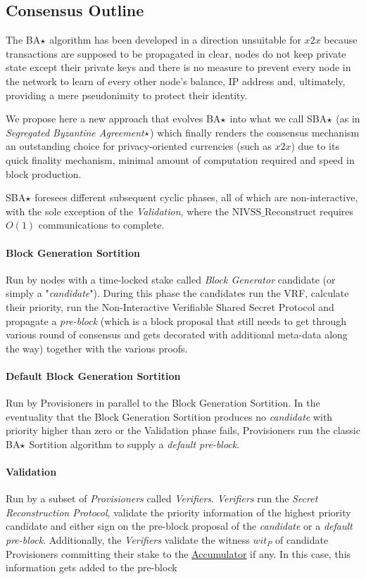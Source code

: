 \subsection{Consensus Outline}

The BA$\large\star$ algorithm has been developed in a direction unsuitable for $x2x$ because transactions are supposed to be propagated in clear, nodes do not keep private state except their private keys and there is no measure to prevent every node in the network to learn of every other node's balance, IP address and, ultimately, providing a mere pseudonimity to protect their identity.

We propose here a new approach that evolves BA$\large\star$ into what we call SBA$\large\star$ (as in \textit{Segregated Byzantine Agreement}$\large\star$) which finally renders the consensus mechanism an outstanding choice for privacy-oriented currencies (such as $x2x$) due to its quick finality mechanism, minimal amount of computation required and speed in block production.

SBA$\large\star$ foresees different subsequent cyclic phases, all of which are non-interactive, with the sole exception of the \textit{Validation}, where the $\textrm{NIVSS\_Reconstruct}$ requires $O(1)$ communications to complete.
\paragraph*{Block Generation Sortition} Run by nodes with a time-locked stake called \textit{Block Generator} candidate (or simply a "\textit{candidate}"). During this phase the candidates run the VRF, calculate their priority, run the Non-Interactive Verifiable Shared Secret Protocol and propagate a \textit{pre-block} (which is a block proposal that still needs to get through various round of consensus and gets decorated with additional meta-data along the way) together with the various proofs.

\paragraph*{Default Block Generation Sortition} 
Run by Provisioners in parallel to the Block Generation Sortition. In the eventuality that the Block Generation Sortition produces no \textit{candidate} with priority higher than zero or the Validation phase fails, Provisioners run the classic BA$\large\star$ Sortition algorithm to supply a \textit{default pre-block}.  
\paragraph*{Validation}
Run by a subset of \textit{Provisioners} called \textit{Verifiers}. \textit{Verifiers} run the \textit{Secret Reconstruction Protocol}, validate the priority information of the highest priority candidate and either sign on the pre-block proposal of the \textit{candidate} or a \textit{default pre-block}. Additionally, the \textit{Verifiers} validate the witness $wit_P$ of candidate Provisioners committing their stake to the \hyperref[sec:Cryptographically-Committed-Provisioners]{Accumulator} if any. In this case, this information gets added to the pre-block
